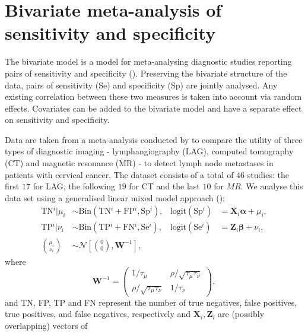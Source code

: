 \documentclass[a4paper,11pt]{article}
\def\mm#1{\ensuremath{\boldsymbol{#1}}} %
\begin{document}
\section*{Bivariate meta-analysis of sensitivity and specificity}

The bivariate model is a model for meta-analysing diagnostic studies
reporting pairs of sensitivity and specificity (\cite{Reitsma_etal_2005}).
Preserving the bivariate structure of the data, pairs of sensitivity
(Se) and specificity (Sp) are jointly analysed. Any existing
correlation between these two measures is taken into account via
random effects. Covariates can be added to the bivariate model and
have a separate effect on sensitivity and specificity.

 Data are taken from a meta-analysis conducted by \cite{Scheidler_etal_1997}
    to compare the utility of three types of diagnostic imaging -
    lymphangiography (LAG), computed tomography (CT) and magnetic
    resonance (MR) - to detect lymph node metastases in patients with
    cervical cancer. The dataset consists of a total of $46$ studies:
    the first $17$ for LAG, the following $19$ for CT and the last
    $10$ for $MR$. We analyse this data set using a generalised linear
    mixed model approach (\cite{Chu_Cole_2006}):
    \begin{align}
        \text{TN}{^i}|\mu_i &\sim \text{Bin}(\text{TN}{^i} +
        \text{FP}{^i}, \text{Sp}{^i}),&
        \text{logit}(\text{Sp}{^i}) &= \mm{X}_i \mm{\alpha} + \mu_i,\\
        \text{TP}{^i}|\nu_i &\sim \text{Bin}(\text{TP}{^i} +
        \text{FN}{^i}, \text{Se}{^i}),&
        \text{logit}(\text{Se}{^i}) &= \mm{Z}_i \mm{\beta} + \nu_i,\\[0.3cm]
        {\mu_i \choose \nu_i} &\sim \mathcal{N} \left[ {0 \choose 0}, \mathbf{W}^{-1}
        \right], \label{eq:biv}
    \end{align}
        where
        \begin{equation*}
           \mathbf{W}^{-1} = \begin{pmatrix} 1/\tau_\mu & \rho/\sqrt{\tau_\mu \tau_\nu} \\
              \rho/\sqrt{\tau_\mu \tau_\nu} & 1/\tau_\nu
          \end{pmatrix},
        \end{equation*}
    and TN, FP, TP and FN represent the number of true negatives,
    false positives, true positives, and false negatives, respectively
    and $\mm{X}_i, \mm{Z}_i$ are (possibly overlapping) vectors of
\end{document}
